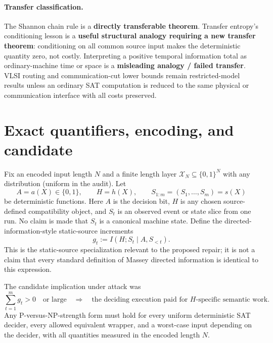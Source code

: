\documentclass[11pt]{article}
\begin{document}
\paragraph{Transfer classification.}
The Shannon chain rule is a \textbf{directly transferable theorem}.  Transfer
entropy's conditioning lesson is a \textbf{useful structural analogy requiring
a new transfer theorem}: conditioning on all common source input makes the
deterministic quantity zero, not costly.  Interpreting a positive temporal
information total as ordinary-machine time or space is a \textbf{misleading
analogy / failed transfer}.  VLSI routing and communication-cut lower bounds
remain restricted-model results unless an ordinary SAT computation is reduced
to the same physical or communication interface with all costs preserved.

\section{Exact quantifiers, encoding, and candidate}
Fix an encoded input length $N$ and a finite length layer $\mathcal X_N
\subseteq\{0,1\}^N$ with any distribution (uniform in the audit).  Let
\[
 A=a(X)\in\{0,1\},\qquad H=h(X),\qquad
 S_{1:m}=(S_1,\ldots,S_m)=s(X)
\]
be deterministic functions.  Here $A$ is the decision bit, $H$ is any chosen
source-defined compatibility object, and $S_t$ is an observed event or state
slice from one run.  No claim is made that $S_t$ is a canonical machine state.
Define the directed-information-style static-source increments
\[
 g_t:=I(H;S_t\mid A,S_{<t}).
\]
This is the static-source specialization relevant to the proposed repair; it
is not a claim that every standard definition of Massey directed information
is identical to this expression.

The candidate implication under attack was
\[
 \sum_{t=1}^{m}g_t>0\quad\text{or large}
 \quad\Longrightarrow\quad
 \text{the deciding execution paid for $H$-specific semantic work}.
 \tag{C}
\]
Any P-versus-NP-strength form must hold for every uniform deterministic SAT
decider, every allowed equivalent wrapper, and a worst-case input depending on
the decider, with all quantities measured in the encoded length $N$.
\end{document}
